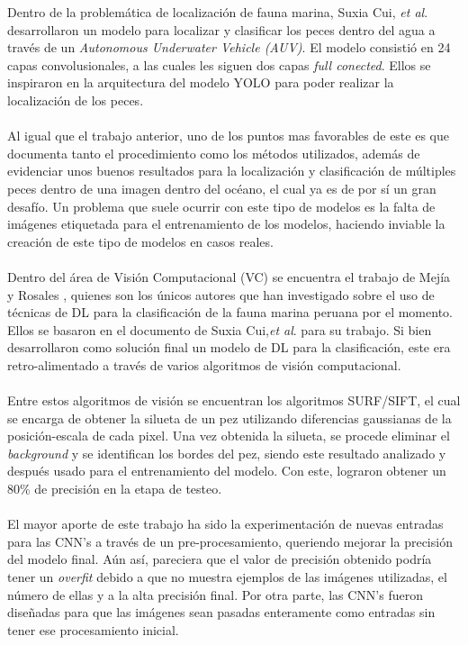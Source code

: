 Dentro de la problemática de localización de fauna marina, Suxia Cui, \textit{et al}. \cite{Cui2020} 
desarrollaron un modelo para localizar y clasificar los peces dentro del agua a través de un 
\textit{Autonomous Underwater Vehicle (AUV)}. El modelo consistió en 24 capas convolusionales, a las 
cuales les siguen dos capas \textit{full conected}. Ellos se inspiraron en la arquitectura del modelo 
YOLO para poder realizar la localización de los peces.\\\\

Al igual que el trabajo anterior, uno de los puntos mas favorables de este es que documenta tanto el 
procedimiento como los métodos utilizados, además de evidenciar unos buenos resultados para la localización 
y clasificación de múltiples peces dentro de una imagen dentro del océano, el cual ya es de por sí un gran 
desafío. Un problema que suele ocurrir con este tipo de modelos es la falta de imágenes etiquetada para el 
entrenamiento de los modelos, haciendo inviable la creación de este tipo de modelos en casos reales.\\\\

Dentro del área de Visión Computacional (VC) se encuentra el trabajo de Mejía y Rosales 
\cite{20.500.12724/11174}, quienes son los únicos autores que han investigado sobre el uso 
de técnicas de DL para la clasificación de la fauna marina peruana por el momento. Ellos se 
basaron en el documento de Suxia Cui,\textit{et al}. para su trabajo. Si bien desarrollaron como 
solución final un modelo de DL para la clasificación, este era retro-alimentado a través de 
varios algoritmos de visión computacional.\\\\
Entre estos algoritmos de visión se encuentran los algoritmos SURF/SIFT, el cual se encarga de obtener la 
silueta de un pez utilizando diferencias gaussianas de la posición-escala de cada pixel. Una vez obtenida 
la silueta, se procede eliminar el \textit{background} y se identifican los bordes del pez, siendo este 
resultado analizado y después usado para el entrenamiento del modelo. Con este, lograron obtener un 80\% 
de precisión en la etapa de testeo.\\\\

El mayor aporte de este trabajo ha sido la experimentación de nuevas entradas para las CNN's a través de un 
pre-procesamiento, queriendo mejorar la precisión del modelo final. Aún así, pareciera que el valor de precisión 
obtenido podría tener un \textit{overfit} debido a que no muestra ejemplos de las imágenes utilizadas, el número de 
ellas y a la alta precisión final. Por otra parte, las CNN's fueron diseñadas para que las imágenes sean pasadas 
enteramente como entradas sin tener ese procesamiento inicial.\\\\


